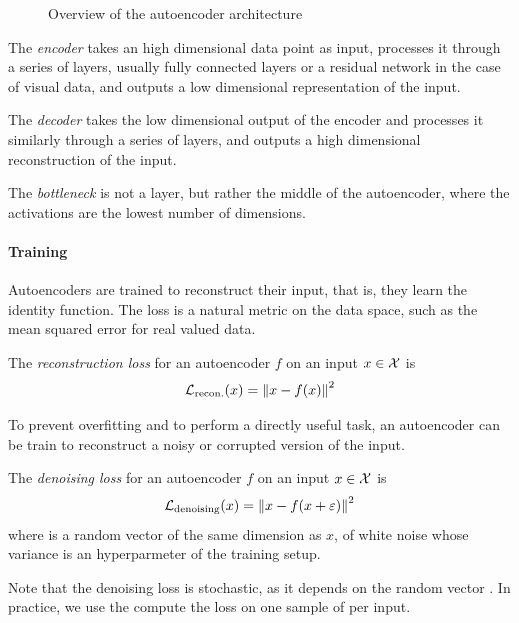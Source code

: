 \documentclass[]{scrarticle}
\begin{document}
\begin{figure}[h]
  \centering
  \caption{Overview of the autoencoder architecture}
  \label{fig:autoencoder}
\end{figure}

The \emph{encoder} takes an high dimensional data point as input,
processes it through a series of layers, usually fully connected layers
or a residual network \cite{He2015DeepRL} in the case of visual data,
and outputs a low dimensional representation of the input.

The \emph{decoder} takes the low dimensional output of the encoder and
processes it similarly through a series of layers,
and outputs a high dimensional reconstruction of the input.

The \emph{bottleneck} is not a layer, but rather the middle of the autoencoder,
where the activations are the lowest number of dimensions.

\paragraph{Training}
Autoencoders are trained to reconstruct their input,
that is, they learn the identity function. The loss is a natural metric
on the data space, such as the mean squared error for real valued data.

\begin{definition}
  The \emph{reconstruction loss} for an autoencoder $f$ on an input $x \in \mathcal X$
  is
  \[
    \mathcal L_{\text{recon.}}(x) = \left\| x - f(x) \right\|^2
  \]
\end{definition}

To prevent overfitting and to perform a directly useful task,
an autoencoder can be train to reconstruct a noisy or corrupted
version of the input.
\begin{definition}
  The \emph{denoising loss} for an autoencoder $f$ on an input $x \in \mathcal X$ is
  \[
    \mathcal L_{\text{denoising}}(x) = \left\| x - f(x + \varepsilon) \right\|^2
  \]
  where \e is a random vector of the same dimension as $x$, of white noise
  whose variance is an hyperparmeter of the training setup.

  Note that the denoising loss is stochastic, as it depends on the random
  vector \e. In practice, we use the compute the loss on one sample of \e
  per input.
\end{definition}
\end{document}
